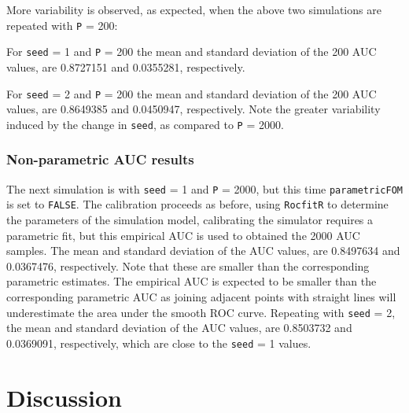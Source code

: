 \documentclass[
]{book}
\begin{document}
More variability is observed, as expected, when the above two simulations are repeated with \texttt{P} = 200:

For \texttt{seed} = 1 and \texttt{P} = 200 the mean and standard deviation of the 200 AUC values, are 0.8727151 and 0.0355281, respectively.

For \texttt{seed} = 2 and \texttt{P} = 200 the mean and standard deviation of the 200 AUC values, are 0.8649385 and 0.0450947, respectively. Note the greater variability induced by the change in \texttt{seed}, as compared to \texttt{P} = 2000.

\hypertarget{non-parametric-auc-results}{%
\subsubsection{Non-parametric AUC results}\label{non-parametric-auc-results}}

The next simulation is with \texttt{seed} = 1 and \texttt{P} = 2000, but this time \texttt{parametricFOM} is set to \texttt{FALSE}. The calibration proceeds as before, using \texttt{RocfitR} to determine the parameters of the simulation model, calibrating the simulator requires a parametric fit, but this empirical AUC is used to obtained the 2000 AUC samples. The mean and standard deviation of the AUC values, are 0.8497634 and 0.0367476, respectively. Note that these are smaller than the corresponding parametric estimates. The empirical AUC is expected to be smaller than the corresponding parametric AUC as joining adjacent points with straight lines will underestimate the area under the smooth ROC curve. Repeating with \texttt{seed} = 2, the mean and standard deviation of the AUC values, are 0.8503732 and 0.0369091, respectively, which are close to the \texttt{seed} = 1 values.

\hypertarget{sources-of-variability-Discussion}{%
\section{Discussion}\label{sources-of-variability-Discussion}}
\end{document}

